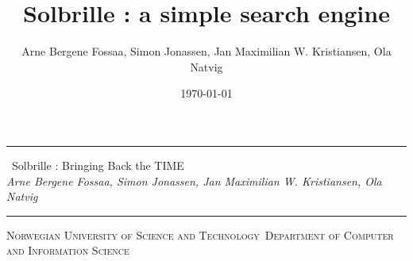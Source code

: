 \title{Solbrille : a simple search engine}
\author{Arne Bergene Fossaa, Simon Jonassen, Jan Maximilian W. Kristiansen, Ola Natvig}
\date{\today}

\newcommand{\HRule}{\rule{\linewidth}{1mm}}

\noindent\HRule
\begin{center}
  \huge
  \noindent \ Solbrille : Bringing Back the TIME \\ [7mm] \large
  \noindent \emph{Arne Bergene Fossaa, Simon Jonassen, Jan Maximilian W. Kristiansen, Ola Natvig}
\end{center}
\noindent\HRule
{}
\begin{center}
\Large\textsc{Norwegian University of Science and Technology}\
\Large\textsc{Department of Computer and Information Science}\
\end{center}
